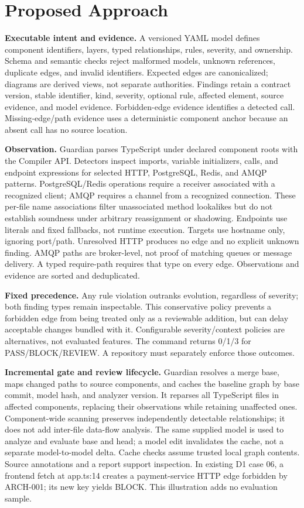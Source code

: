 \section{Proposed Approach}
\textbf{Executable intent and evidence.} A versioned YAML model defines component identifiers, layers, typed relationships, rules, severity, and ownership. Schema and semantic checks reject malformed models, unknown references, duplicate edges, and invalid identifiers. Expected edges are canonicalized; diagrams are derived views, not separate authorities. Findings retain a contract version, stable identifier, kind, severity, optional rule, affected element, source evidence, and model evidence. Forbidden-edge evidence identifies a detected call. Missing-edge/path evidence uses a deterministic component anchor because an absent call has no source location.

\textbf{Observation.} Guardian parses TypeScript under declared component roots with the Compiler API. Detectors inspect imports, variable initializers, calls, and endpoint expressions for selected HTTP, PostgreSQL, Redis, and AMQP patterns. PostgreSQL/Redis operations require a receiver associated with a recognized client; AMQP requires a channel from a recognized connection. These per-file name associations filter unassociated method lookalikes but do not establish soundness under arbitrary reassignment or shadowing. Endpoints use literals and fixed fallbacks, not runtime execution. Targets use hostname only, ignoring port/path. Unresolved HTTP produces no edge and no explicit unknown finding. AMQP paths are broker-level, not proof of matching queues or message delivery. A typed require-path requires that type on every edge. Observations and evidence are sorted and deduplicated.

\textbf{Fixed precedence.} Any rule violation outranks evolution, regardless of severity; both finding types remain inspectable. This conservative policy prevents a forbidden edge from being treated only as a reviewable addition, but can delay acceptable changes bundled with it. Configurable severity/context policies are alternatives, not evaluated features. The command returns 0/1/3 for PASS/BLOCK/REVIEW. A repository must separately enforce those outcomes.

\textbf{Incremental gate and review lifecycle.} Guardian resolves a merge base, maps changed paths to source components, and caches the baseline graph by base commit, model hash, and analyzer version. It reparses all TypeScript files in affected components, replacing their observations while retaining unaffected ones. Component-wide scanning preserves independently detectable relationships; it does not add inter-file data-flow analysis. The same supplied model is used to analyze and evaluate base and head; a model edit invalidates the cache, not a separate model-to-model delta. Cache checks assume trusted local graph contents. Source annotations and a report support inspection. In existing D1 case 06, a frontend fetch at app.ts:14 creates a payment-service HTTP edge forbidden by ARCH-001; its new key yields BLOCK. This illustration adds no evaluation sample.

